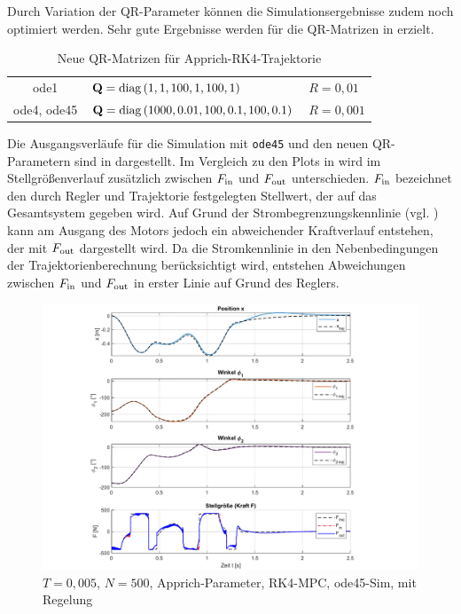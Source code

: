 Durch Variation der QR-Parameter können die Simulationsergebnisse zudem noch optimiert werden. Sehr gute Ergebnisse werden für die QR-Matrizen in  erzielt.
\begin{table}[h]
	\centering
	\caption{Neue QR-Matrizen für Apprich-RK4-Trajektorie}
		\begin{tabular}{cll}
			\toprule
			ode1        & ${\boldsymbol{\mathrm{Q}}} = \mathrm{diag}\left(1, 1, 100, 1, 100, 1\right)$           & $R=0,01$ \\
			ode4, ode45 & ${\boldsymbol{\mathrm{Q}}} = \mathrm{diag}\left(1000, 0.01, 100, 0.1, 100, 0.1\right)$ & $R=0,001$ \\
			\bottomrule
		\end{tabular}
	\label{tab:NeueQR}
\end{table}

Die Ausgangsverläufe für die Simulation mit \texttt{ode45} und den neuen QR-Parametern sind in  dargestellt. Im Vergleich zu den Plots in  wird im Stellgrößenverlauf zusätzlich zwischen $F_{\mathrm{in}}$ und $F_{\mathrm{out}}$ unterschieden. $F_{\mathrm{in}}$ bezeichnet den durch Regler und Trajektorie festgelegten Stellwert, der auf das Gesamtsystem gegeben wird. Auf Grund der Strombegrenzungskennlinie (vgl. ) kann am Ausgang des Motors jedoch ein abweichender Kraftverlauf entstehen, der mit $F_{\mathrm{out}}$ dargestellt wird. Da die Stromkennlinie in den Nebenbedingungen der Trajektorienberechnung berücksichtigt wird, entstehen Abweichungen zwischen $F_{\mathrm{in}}$ und $F_{\mathrm{out}}$ in erster Linie auf Grund des Reglers. 
\begin{figure}[h]
	\centering
		\includegraphics[scale=\scaleyplots]{Bilder/Trajektorien/F410T0.005_app_rk4_ode45_TFR_QR-neu.pdf}
	\caption{$T=0,005$, $N=500$, Apprich-Parameter, RK4-MPC, ode45-Sim, mit Regelung}
	\label{fig:F410T0.005_app_rk4_ode45_TFR_QR-neu}
\end{figure}

